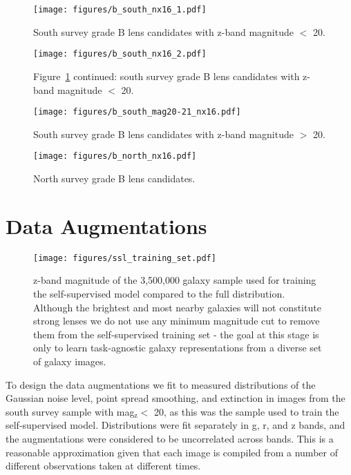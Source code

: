 \documentclass{aastex631}
\newcommand{\zmag}{mag$_{\mathrm{z}}$}
\begin{document}
\begin{figure*}
    \centering
    \texttt{[image: figures/b\_south\_nx16\_1.pdf]}
    \caption{South survey grade B lens candidates with z-band magnitude $<$ 20.}
    \label{fig:b_south_1}
\end{figure*}
\begin{figure*}
    \centering
    \texttt{[image: figures/b\_south\_nx16\_2.pdf]}
    \caption{Figure~\ref{fig:b_south_1} continued: south survey grade B lens candidates with z-band magnitude $<$ 20.}
    \label{fig:b_south_2}
\end{figure*}
\begin{figure*}
    \centering
    \texttt{[image: figures/b\_south\_mag20-21\_nx16.pdf]}
    \caption{South survey grade B lens candidates with z-band magnitude $>$ 20.}
    \label{fig:b_southmag20-21}
\end{figure*}
\begin{figure*}
    \centering
    \texttt{[image: figures/b\_north\_nx16.pdf]}
    \caption{North survey grade B lens candidates.}
    \label{fig:b_north}
\end{figure*}


\section{Data Augmentations}
\label{app:augmentations}
\begin{figure}
    \centering
    \texttt{[image: figures/ssl\_training\_set.pdf]}
    \caption{z-band magnitude of the 3,500,000 galaxy sample used for training the self-supervised model compared to the full distribution. Although the brightest and most nearby galaxies will not constitute strong lenses we do not use any minimum magnitude cut to remove them from the self-supervised training set - the goal at this stage is only to learn task-agnostic galaxy representations from a diverse set of galaxy images.}
    \label{fig:ssl_training_set}
\end{figure}

To design the data augmentations we fit to measured distributions of the Gaussian noise level, point spread smoothing, and extinction in images from the south survey sample with \zmag $<$ 20, as this was the sample used to train the self-supervised model. Distributions were fit separately in g, r, and z bands, and the augmentations were considered to be uncorrelated across bands. This is a reasonable approximation given that each image is compiled from a number of different observations taken at different times. 
\end{document}
